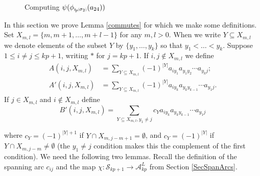 \documentclass[11pt]{amsart}
\newcommand{\oarc}[4]{
\draw[thick, postaction={on each segment={mid arrow}}] (#1,#2) ..controls (#1 + .2,#2 + .7) and (#3 - .2,#4 + .7) .. (#3,#4);
}
\def\A{{\mathcal A}}
\def\s{{\sigma}}
\newcommand*{\subsmallp}[1]{\scalebox{.5}{\ensuremath#1}}
\newcommand{\subpp}[2][p]{\imath_{\hspace*{-1pt}#1}\hspace*{-.5pt}\subsmallp(#2\subsmallp)}
\theoremstyle{definition}
\begin{document}
{\begin{figure}[ht]
\caption{Computing $\psi(\phi_{\subpp{\s_2}}(a_{24}))$}
\label{FigCommutes}
\end{figure}

}%

In this section we prove Lemma \ref{commutes} for which we make some definitions.  Set $X_{m,l} = \{m,m+1,\ldots,m+l-1\}$ for any $m,l>0$. When we write $Y\subseteq X_{m,l}$ we denote elements of the subset $Y$ by $\{y_1,\ldots,y_k\}$ so that $y_1<\ldots <y_k$.  Suppose $1\le i\ne j\le kp+1$, writing $\ast$ for $j=kp+1$. If $i,j\not\in X_{m,l}$ we define
\begin{align*}
   A(i,j,X_{m,l})   &= \sum_{Y\subseteq X_{m,l}}(-1)^{|Y|}a_{iy_1}a_{y_1y_2}\cdots a_{y_kj};\\
   A'(i,j,X_{m,l})  &= \sum_{Y\subseteq X_{m,l}}(-1)^{|Y|}a_{iy_k}a_{y_ky_{k-1}}\cdots a_{y_1j}.
 \end{align*}
If $j\in X_{m,l}$ and $i\not\in X_{m,l}$ define
$$
B'(i,j,X_{m,l}) = \sum_{Y\subseteq X_{m,l}, y_1\ne j}c_Ya_{iy_k}a_{y_ky_{k-1}}\cdots a_{y_1j}
$$

\noindent where $c_Y = (-1)^{|Y|+1}$ if $Y\cap X_{m,j-m+1} = \emptyset$, and $c_Y = (-1)^{|Y|}$ if $Y\cap X_{m,j-m}\ne\emptyset$ (the $y_1\ne j$ condition makes this the complement of the first condition). We need the following two lemmas. Recall the definition of the spanning arc $c_{ij}$ and the map $\chi:\mathscr S_{kp+1}\to\A_{kp}^L$ from Section \ref{SecSpanArcs}.
\end{document}
